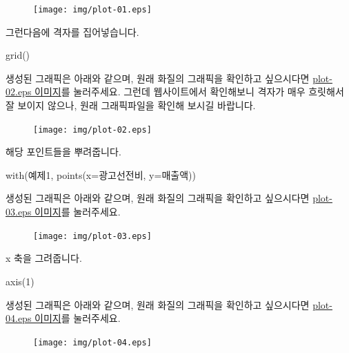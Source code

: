 \begin{figure}
\begin{center}
\texttt{[image: img/plot-01.eps]}
\end{center}
\end{figure}
 
 
그런다음에 격자를 집어넣습니다. 
\begin{Schunk}
\begin{Soutput}	
grid()
\end{Soutput}
\end{Schunk}
생성된 그래픽은 아래와 같으며, 원래 화질의 그래픽을 확인하고 싶으시다면 \href{http://korea.gnu.org/gnustats/img/plot-02.eps}{plot-02.eps 이미지}를 눌러주세요.
그런데 웹사이트에서 확인해보니 격자가 매우 흐릿해서 잘 보이지 않으나, 원래 그래픽파일을 확인해 보시길 바랍니다.  

\begin{figure}
\begin{center}
\texttt{[image: img/plot-02.eps]}
\end{center}
\end{figure}


해당 포인트들을 뿌려줍니다.
\begin{Schunk}
\begin{Soutput}	
with(예제1, points(x=광고선전비, y=매출액))
\end{Soutput}
\end{Schunk}
생성된 그래픽은 아래와 같으며, 원래 화질의 그래픽을 확인하고 싶으시다면 \href{http://korea.gnu.org/gnustats/img/plot-03.eps}{plot-03.eps 이미지}를 눌러주세요. 

\begin{figure}
\begin{center}
\texttt{[image: img/plot-03.eps]}
\end{center}
\end{figure}

x 축을 그려줍니다. 
\begin{Schunk}
\begin{Soutput}	
axis(1)
\end{Soutput}
\end{Schunk}
생성된 그래픽은 아래와 같으며, 원래 화질의 그래픽을 확인하고 싶으시다면 \href{http://korea.gnu.org/gnustats/img/plot-04.eps}{plot-04.eps 이미지}를 눌러주세요. 

\begin{figure}
\begin{center}
\texttt{[image: img/plot-04.eps]}
\end{center}
\end{figure}

